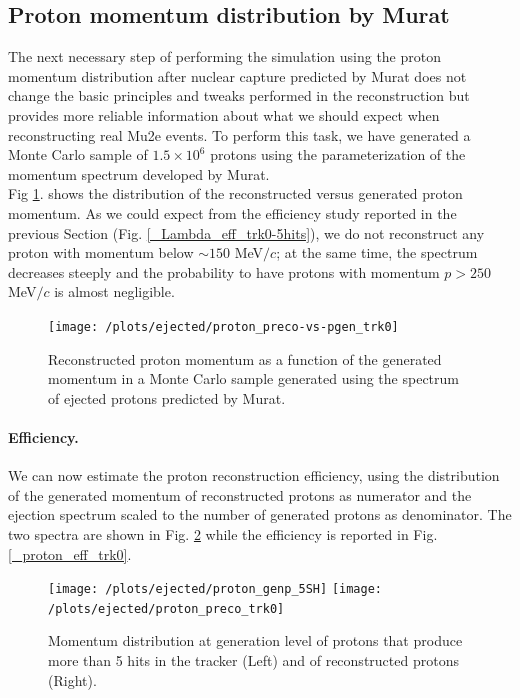 \documentclass[12pt,a4paper,openright, oneside, titlepage]{book} %
\begin{document}
\subsection{Proton momentum distribution by Murat}
The next necessary step of performing the simulation using the proton momentum distribution 
after nuclear capture predicted by Murat does not change the basic principles 
and tweaks performed in the reconstruction but provides more reliable information 
about what we should expect when reconstructing real Mu2e events. 
To perform this task, we have generated a Monte Carlo sample of $1.5\times10^6$ protons 
using the parameterization of the momentum spectrum developed by Murat.\\
Fig \ref{_proton_preco-vs-pgen_trk0}. shows
the distribution of the reconstructed versus generated proton momentum. 
As we could expect from the efficiency study reported in the previous Section (Fig. \ref{_Lambda_eff_trk0-5hits}), 
we do not reconstruct any proton with momentum below $\sim 150$ MeV$/c$; 
at the same time, the spectrum decreases steeply and the probability to have 
protons with momentum $p > 250$ MeV$/c$ is almost negligible.

\begin{figure}[!htb]
\centering
\texttt{[image: /plots/ejected/proton\_preco-vs-pgen\_trk0]}
\caption[Reconstructed vs generated momentum (ejected protons)]
{Reconstructed proton momentum as a function of the generated momentum 
in a Monte Carlo sample generated
using the spectrum of ejected protons predicted by Murat.}
\label{_proton_preco-vs-pgen_trk0}
\end{figure}

\paragraph{Efficiency.} We can now estimate the proton reconstruction efficiency, 
using the distribution of the generated momentum of reconstructed protons as numerator 
and the ejection spectrum scaled to the number of generated protons as denominator. 
The two spectra are shown in Fig. \ref{_proton_momenta} while the efficiency is reported in Fig. \ref{_proton_eff_trk0}.

\begin{figure}[h!]
\centering
\texttt{[image: /plots/ejected/proton\_genp\_5SH]}\hfill
\texttt{[image: /plots/ejected/proton\_preco\_trk0]}
\caption[Momentum distributions of generated particles with more then 5 StrawHits and reconstructed particles]
{Momentum distribution at generation level of protons that produce more than 5 hits in the tracker (Left) 
and of reconstructed protons (Right).}
\label{_proton_momenta}
\end{figure}
\end{document}
